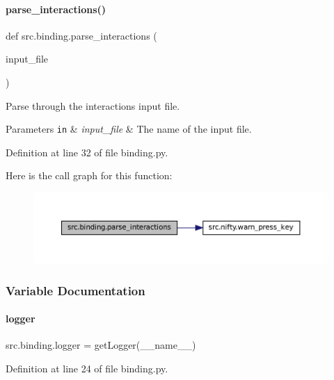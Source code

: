\paragraph{\texorpdfstring{parse\+\_\+interactions()}{parse\_interactions()}}
{\footnotesize\ttfamily def src.\+binding.\+parse\+\_\+interactions (\begin{DoxyParamCaption}\item[{}]{input\+\_\+file }\end{DoxyParamCaption})}



Parse through the interactions input file. 


\begin{DoxyParams}[1]{Parameters}
\mbox{\tt in}  & {\em input\+\_\+file} & The name of the input file. \\
\hline
\end{DoxyParams}


Definition at line 32 of file binding.\+py.

Here is the call graph for this function\+:
\nopagebreak
\begin{figure}[H]
\begin{center}
\leavevmode
\includegraphics[width=350pt]{namespacesrc_1_1binding_a79f9c8e458e824b50a4132da96c81ae7_cgraph}
\end{center}
\end{figure}


\subsubsection{Variable Documentation}
\mbox{\label{namespacesrc_1_1binding_ae1fc16e92024487ea1e945ff16713aae}} 
\paragraph{\texorpdfstring{logger}{logger}}
{\footnotesize\ttfamily src.\+binding.\+logger = get\+Logger(\+\_\+\+\_\+name\+\_\+\+\_\+)}



Definition at line 24 of file binding.\+py.

